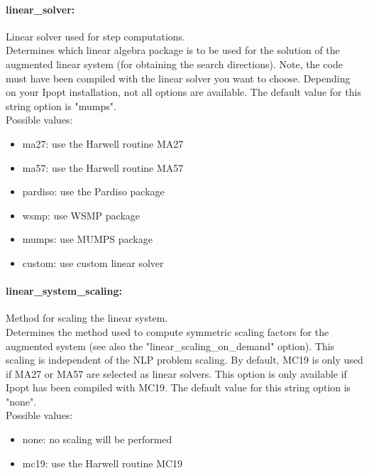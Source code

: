 \paragraph{linear\_solver:}\label{sec:linear_solver} Linear solver used for step computations. $\;$ \\
 Determines which linear algebra package is to be
used for the solution of the augmented linear
system (for obtaining the search directions).
Note, the code must have been compiled with the
linear solver you want to choose. Depending on
your Ipopt installation, not all options are
available.
The default value for this string option is "mumps".
\\ 
Possible values:
\begin{itemize}
   \item ma27: use the Harwell routine MA27
   \item ma57: use the Harwell routine MA57
   \item pardiso: use the Pardiso package
   \item wsmp: use WSMP package
   \item mumps: use MUMPS package
   \item custom: use custom linear solver
\end{itemize}

\paragraph{linear\_system\_scaling:}\label{sec:linear_system_scaling} Method for scaling the linear system. $\;$ \\
 Determines the method used to compute symmetric
scaling factors for the augmented system (see
also the "linear\_scaling\_on\_demand" option). 
This scaling is independent of the NLP problem
scaling.  By default, MC19 is only used if MA27
or MA57 are selected as linear solvers. This
option is only available if Ipopt has been
compiled with MC19.
The default value for this string option is "none".
\\ 
Possible values:
\begin{itemize}
   \item none: no scaling will be performed
   \item mc19: use the Harwell routine MC19
\end{itemize}


